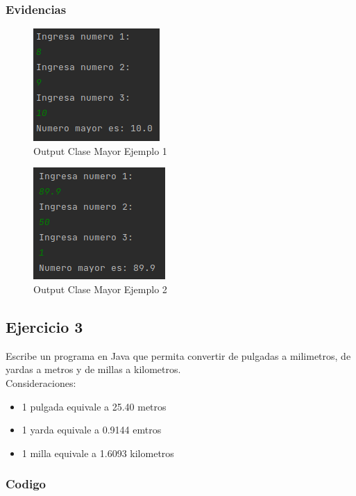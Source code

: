 \documentclass{article}
\begin{document}
\subsubsection{Evidencias}

\begin{figure}[h]
	\centering
	\includegraphics[scale = 1]{images/mayor1.png}
	\caption{Output Clase Mayor Ejemplo 1}
\end{figure}

\begin{figure}[h]
	\centering
	\includegraphics[scale = 1]{images/mayor2.png}
	\caption{Output Clase Mayor Ejemplo 2}
\end{figure}
\newpage

\subsection{Ejercicio 3}

Escribe un programa en Java que permita convertir de pulgadas a milimetros, de yardas a metros y de millas a kilometros.\\

Consideraciones:

\begin{itemize}
	\item 1 pulgada equivale a 25.40 metros
	\item 1 yarda equivale a 0.9144 emtros
	\item 1 milla equivale a 1.6093 kilometros
\end{itemize}

\subsubsection{Codigo}
\end{document}
